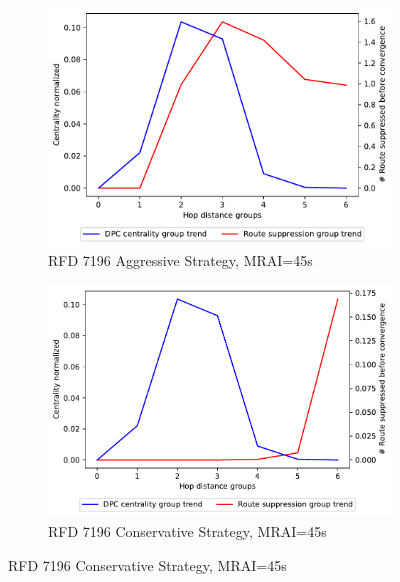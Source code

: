 \begin{figure}[H]
\begin{subfigure}[b]{0.325\textwidth}
     \end{subfigure}
     \hfill
     \begin{subfigure}[b]{0.325\textwidth}
         \centering
         \includegraphics[width=\textwidth]{images/RFD/miceVSelephants/MultiMRAI/45/mice/cisco_1000_RFD_7196_aggressive_nodeConvergence_centVSsup_trend.pdf}
         \caption{RFD 7196 Aggressive Strategy, MRAI=45s}
         \label{fig:1000_7196RFDA_centVSsup_mices}
     \end{subfigure}
     \hfill
     \begin{subfigure}[b]{0.325\textwidth}
         \centering
         \includegraphics[width=\textwidth]{images/RFD/miceVSelephants/MultiMRAI/45/mice/cisco_1000_RFD_7196_conservative_nodeConvergence_centVSsup_trend.pdf}
         \caption{RFD 7196 Conservative Strategy, MRAI=45s}
         \label{fig:1000_7196RFDC_centVSsup_mices}

\end{subfigure}
\end{figure}
